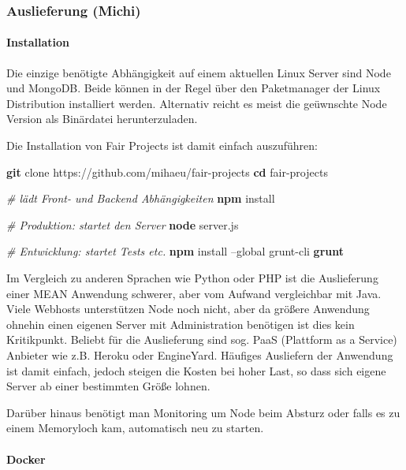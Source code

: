 \documentclass[]{article}
\newenvironment{Shaded}{}{}
\newcommand{\KeywordTok}[1]{\textcolor[rgb]{0.00,0.44,0.13}{\textbf{{#1}}}}
\newcommand{\CommentTok}[1]{\textcolor[rgb]{0.38,0.63,0.69}{\textit{{#1}}}}
\newcommand{\NormalTok}[1]{{#1}}
\begin{document}
\subsubsection{Auslieferung (Michi)}\label{auslieferung-michi}

\paragraph{Installation}\label{installation}

Die einzige benötigte Abhängigkeit auf einem aktuellen Linux Server sind
Node und MongoDB. Beide können in der Regel über den Paketmanager der
Linux Distribution installiert werden. Alternativ reicht es meist die
geüwnschte Node Version als Binärdatei herunterzuladen.

Die Installation von Fair Projects ist damit einfach auszuführen:

\begin{Shaded}
\begin{Highlighting}[]
\KeywordTok{git} \NormalTok{clone https://github.com/mihaeu/fair-projects}
\KeywordTok{cd} \NormalTok{fair-projects}

\CommentTok{# lädt Front- und Backend Abhängigkeiten}
\KeywordTok{npm} \NormalTok{install}

\CommentTok{# Produktion: startet den Server}
\KeywordTok{node} \NormalTok{server.js}

\CommentTok{# Entwicklung: startet Tests etc.}
\KeywordTok{npm} \NormalTok{install --global grunt-cli}
\KeywordTok{grunt}
\end{Highlighting}
\end{Shaded}

Im Vergleich zu anderen Sprachen wie Python oder PHP ist die
Auslieferung einer MEAN Anwendung schwerer, aber vom Aufwand
vergleichbar mit Java. Viele Webhosts unterstützen Node noch nicht, aber
da größere Anwendung ohnehin einen eigenen Server mit Administration
benötigen ist dies kein Kritikpunkt. Beliebt für die Auslieferung sind
sog. PaaS (Plattform as a Service) Anbieter wie z.B. Heroku oder
EngineYard. Häufiges Ausliefern der Anwendung ist damit einfach, jedoch
steigen die Kosten bei hoher Last, so dass sich eigene Server ab einer
bestimmten Größe lohnen.

Darüber hinaus benötigt man Monitoring um Node beim Absturz oder falls
es zu einem Memoryloch kam, automatisch neu zu starten.

\paragraph{Docker}\label{docker}
\end{document}

